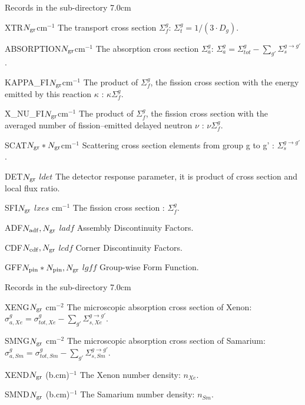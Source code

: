  
 \begin{DescriptionEnregistrement}{Records 
 in the sub-directory  }{7.0cm} \label{tabl:tabMA}
 
 \RealEnr
 {XTR}{$N_{\rm gr}$}{cm$^{-1}$}
 {The transport cross section $\Sigma^g_f$:
 $\Sigma^g_t = 1 / ( 3 \cdot D_{g} ) $. }
 
 \RealEnr
 {ABSORPTION}{$N_{\rm gr}$}{cm$^{-1}$}
 {The absorption cross section $\Sigma^g_a$: $\Sigma^g_a = \Sigma^g_{tot} - \sum_{g'} \Sigma^{g \rightarrow g'}_s $. }
 
 \RealEnr
 {KAPPA\_FI}{$N_{\rm gr}$}{cm$^{-1}$}
 {The product of $\Sigma^g_f$, the fission cross section with  the energy emitted by this reaction $\kappa$ :  $\kappa\Sigma^g_f$. }

 \RealEnr
 {X\_NU\_FI}{$N_{\rm gr}$}{cm$^{-1}$}
 {The product of $\Sigma^g_f$, the fission cross section with  the averaged number of fission–emitted delayed
neutron $\nu$ :  $\nu\Sigma^g_f$. }
 
 \RealEnr
 {SCAT}{$N_{\rm gr}*N_{\rm gr}$}{cm$^{-1}$}
 {Scattering cross section elements  from group g to g' : $\Sigma^{g \rightarrow g'}_s$. }
 
 \OptRealEnr
 {DET}{$N_{\rm gr}$} {$ldet$} { } 
 {The detector response parameter, it is product of cross section and local flux ratio. }
 
 \OptRealEnr
 {SFI}{$N_{\rm gr}$} {$lxes$} {cm$^{-1}$} 
 {The fission cross section : $\Sigma^g_f$. } 
 
 \OptRealEnr
 {ADF}{$N_{\rm adf},N_{\rm gr}$} {$ladf$} { }  
 { Assembly Discontinuity Factors. } 
 
 \OptRealEnr
 {CDF}{$N_{\rm cdf},N_{\rm gr}$} {$lcdf$} { }  
 { Corner Discontinuity Factors. } 
 
  \OptRealEnr
 {GFF}{$N_{\rm pin} * N_{\rm pin },N_{\rm gr}$} {$lgff$} { }  
 { Group-wise Form Function. } 
  
 \end{DescriptionEnregistrement} 
 
  \begin{DescriptionEnregistrement}{Records 
 in the sub-directory  }{7.0cm} \label{tabl:tabMI}
 
 \OptRealEnr
 {XENG}{$N_{\rm gr}$} {} { cm$^{-2}$} 
 {The microscopic absorption cross section of Xenon: $\sigma^g_{a,Xe} = \sigma^g_{tot,Xe} - \sum_{g'} \Sigma^{g \rightarrow g'}_{s, Xe} $. }
 
 \OptRealEnr
 {SMNG}{$N_{\rm gr}$} {} {cm$^{-2}$ } 
 {The microscopic absorption cross section of Samarium: $\sigma^g_{a,Sm} = \sigma^g_{tot,Sm} - \sum_{g'} \Sigma^{g \rightarrow g'}_{s, Sm} $.}
 
  \OptRealEnr
 {XEND}{$N_{\rm gr}$} {} {(b.cm)$^{-1}$} 
 {The Xenon number density: $n_{Xe}$.}
 
  \OptRealEnr
 {SMND}{$N_{\rm gr}$} {} {(b.cm)$^{-1}$} 
 {The Samarium number density: $n_{Sm}$.}
  
 \end{DescriptionEnregistrement} 

